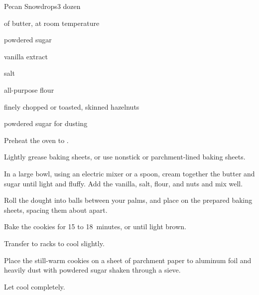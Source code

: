 \begin{recipe}{Pecan Snowdrops}{}{3 dozen}

\begin{ingredients}
\item \C{\threequarter} of butter, at room temperature
\item \C{\third} powdered sugar
\item {} vanilla extract
\item \tp{\eighth} salt
\item \C{1 \half} all-purpose flour
\item \C{\threequarter} finely chopped  or toasted, skinned hazelnuts
\item powdered sugar for dusting
\end{ingredients}

\begin{directions}
\item Preheat the oven to .
\item Lightly grease baking sheets, or use nonstick or parchment-lined baking sheets.
\item In a large bowl, using an electric mixer or a spoon, cream together the butter and sugar until light and fluffy.  Add the vanilla, salt, flour, and nuts and mix well.
\item Roll the dought into \inch{\threequarter} balls between your palms, and place on the prepared baking sheets, spacing them about \inch{1 \half} apart.
\item Bake the cookies for 15 to 18~minutes, or until light brown.
\item Transfer to racks to cool slightly.
\item Place the still-warm cookies on a sheet of parchment paper to aluminum foil and heavily dust with powdered sugar shaken through a sieve.
\item Let cool completely.
\end{directions}

\end{recipe}
